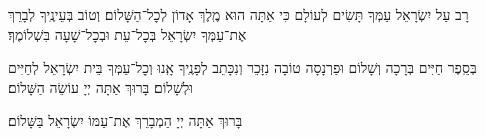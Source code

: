 \documentclass[twoside, openany, parskip=half, 11pt]{book}
\begin{document}
\weekdaysashemakoleinu

\retzeh

\yaalehveyavo

\zion

\maarivmodim

\alhanisim

\weekdaysahodos

רָב עַל יִשְׂרָאֵל עַמְּךָ תָּשִׂים לְעוֹלָם כִּי אַתָּה הוּא מֶֽלֶךְ אָדוֹן לְכׇל־הַשָּׁלוֹם׃ וְטוֹב בְּעֵינֶֽיךָ לְבָרֵךְ אֶת־עַמְּךָ יִשְׂרָאֵל בְּכׇל־עֵת וּבְכׇל־שָׁעָה בִּשְׁלוֹמֶךָ׃
\vspace{-0.4\baselineskip}
\begin{paracol}{2}

\begin{small}
בְּסֵֽפֶר חַיִּים בְּרָכָה וְשָׁלוֹם וּפַרְנָסָה טוֹבָה נִזָּכֵר וְנִכָּתֵב לְפָנֶֽיךָ אָֽנוּ וְכׇל־עַמְּךָ בֵּית יִשְׂרָאֵל לְחַיִּים וּלְשָׁלוֹם׃ בָּרוּךְ אַתָּה יְיָ עוֹשֵׂה הַשָּׁלוֹם׃

\end{small}
\switchcolumn
בָּרוּךְ אַתָּה יְיָ הַמְבָרֵךְ אֶת־עַמּוֹ יִשְׂרָאֵל בַּשָּׁלוֹם׃

\end{paracol}



\tachanunim

\vspace{\baselineskip}
\end{document}
